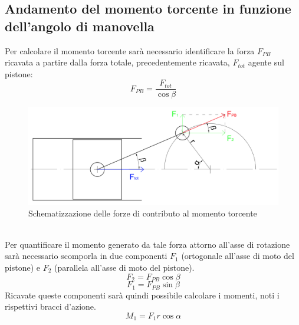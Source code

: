 \subsection{Andamento del momento torcente in funzione dell'angolo di manovella}
Per calcolare il momento torcente sarà necessario identificare la forza $F_{PB}$ ricavata a partire dalla forza totale, precedentemente ricavata, $F_{tot}$ agente sul pistone:
\begin{equation}
    F_{PB}=\frac{F_{tot}}{\cos\beta}
\end{equation}
\begin{figure}[h]
    \centering
    \includegraphics[scale=0.4]{Immagini/SchemaBiellaManovella.png}
    \caption{Schematizzazione delle forze di contributo al momento torcente}
    \label{fig:SchemaBiellaManovella}
\end{figure}
\\
Per quantificare il momento generato da tale forza attorno all’asse di rotazione sarà necessario scomporla in due componenti $F_1$ (ortogonale all’asse di moto del pistone) e $F_2$ (parallela all’asse di moto del pistone).
\begin{equation}
    F_2=F_{PB}\cos\beta
\end{equation}
\begin{equation}
    F_1=F_{PB}\sin\beta
\end{equation}
Ricavate queste componenti sarà quindi possibile calcolare i momenti, noti i rispettivi bracci d’azione.
\begin{equation}
    M_1=F_1r\cos\alpha
\end{equation}
